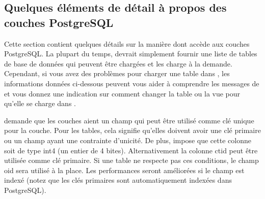 \subsection{Quelques éléments de détail à propos des couches PostgreSQL} \label{sec:postgis_details}

Cette section contient quelques détails sur la manière dont \qg accède aux couches PostgreSQL. La plupart du temps, \qg devrait simplement fournir une liste de tables de base de données qui peuvent être chargées et les charge à la demande. Cependant, si vous avez des problèmes pour charger une table \psq dans \qg, les informations données ci-dessous peuvent vous aider à comprendre les messages de \qg et vous donnez une indication sur comment changer la table ou la vue \psq pour qu'elle se charge dans \qg.

\qg demande que les couches \psq aient un champ qui peut être utilisé comme clé unique pour la couche. Pour les tables, cela signifie qu'elles doivent avoir une clé primaire ou un champ ayant une contrainte d'unicité. De plus, \qg impose que cette colonne soit de type int4 (un entier de 4 bites). Alternativement la colonne ctid peut être utilisée comme clé primaire. Si une table ne respecte pas ces conditions, le champ oid sera utilisé à la place. Les performances seront améliorées si le champ est indexé (notez que les clés primaires sont automatiquement indexées dans PostgreSQL).

